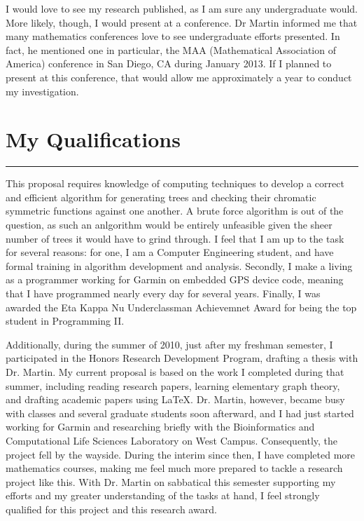 \documentclass[a4paper,12pt]{article}
\begin{document}
\begin{spacing}{1}
I would love to see my research published, as I am sure any undergraduate would. More likely, though, I would present at a conference. Dr Martin informed me that many mathematics conferences love to see undergraduate efforts presented. In fact, he mentioned one in particular, the MAA (Mathematical Association of America) conference in San Diego, CA during January 2013. If I planned to present at this conference, that would allow me approximately a year to conduct my investigation.

\section*{\Large My Qualifications}
\hrule
\vspace{0.4cm}
This proposal requires knowledge of computing techniques to develop a correct and efficient algorithm for generating trees and checking their chromatic symmetric functions against one another. A brute force algorithm is out of the question, as such an anlgorithm would be entirely unfeasible given the sheer number of trees it would have to grind through. I feel that I am up to the task for several reasons: for one, I am a Computer Engineering student, and have formal training in algorithm development and analysis. Secondly, I make a living as a programmer working for Garmin on embedded GPS device code, meaning that I have programmed nearly every day for several years. Finally, I was awarded the Eta Kappa Nu Underclassman Achievemnet Award for being the top student in Programming II.

Additionally, during the summer of 2010, just after my freshman semester, I participated in the Honors Research Development Program, drafting a thesis with Dr. Martin. My current proposal is based on the work I completed during that summer, including reading research papers, learning elementary graph theory, and drafting academic papers using \LaTeX. Dr. Martin, however, became busy with classes and several graduate students soon afterward, and I had just started working for Garmin and researching briefly with the Bioinformatics and Computational Life Sciences Laboratory on West Campus. Consequently, the project fell by the wayside. During the interim since then, I have completed more mathematics courses, making me feel much more prepared to tackle a research project like this. With Dr. Martin on sabbatical this semester supporting my efforts and my greater understanding of the tasks at hand, I feel strongly qualified for this project and this research award.

\end{spacing}

\pagebreak


\end{document}
